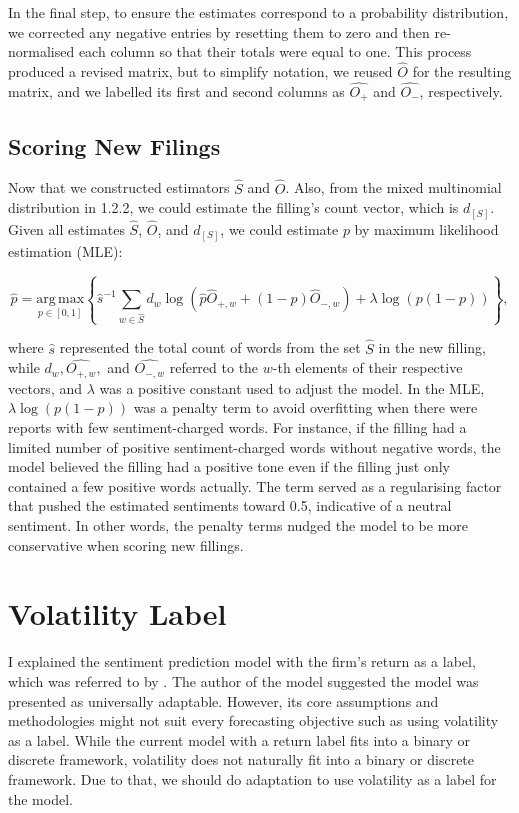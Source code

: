 \documentclass[logo,bsc,singlespacing,parskip]{infthesis}
\begin{document}
In the final step, to ensure the estimates correspond to a probability distribution, we corrected any negative entries by resetting them to zero and then re-normalised each column so that their totals were equal to one. This process produced a revised matrix, but to simplify notation, we reused $\hat{O}$ for the resulting matrix, and we labelled its first and second columns as $\hat{O_+}$ and $ \hat{O_-}$, respectively. 

\subsection{Scoring New Filings}

Now that we constructed estimators $\hat{S}$  and $\hat{O}$. Also, from the mixed multinomial distribution in 1.2.2, we could estimate the filling’s count vector, which is $d_{[S]}$. Given all estimates $\hat{S}$, $\hat{O}$, and $d_{[S]}$, we could estimate $p$ by maximum likelihood estimation (MLE):

\begin{equation} \label{4.8}
\hat{p} = \underset{p \in [0,1]}{\mathrm{arg\,max}} \left\{ \hat{s}^{-1} \sum_{w \in \hat{S}} d_w \log (\hat{p}\hat{O}_{+,w} + (1 - p)\hat{O}_{-,w}) + \lambda \log(p(1 - p)) \right\},
\end{equation}

where $\hat{s}$ represented the total count of words from the set $\hat{S}$ in the new filling, while $d_w, \hat{O_{+,w}},$ and $ \hat{O_{-,w}}$ referred to the $w$-th elements of their respective vectors, and $\lambda$ was a positive constant used to adjust the model. In the MLE, $\lambda \log(p(1 - p))$ was a penalty term to avoid overfitting when there were reports with few sentiment-charged words. For instance, if the filling had a limited number of positive sentiment-charged words without negative words, the model believed the filling had a positive tone even if the filling just only contained a few positive words actually. The term served as a regularising factor that pushed the estimated sentiments toward 0.5, indicative of a neutral sentiment. In other words, the penalty terms nudged the model to be more conservative when scoring new fillings. 

\section{Volatility Label}
\label{sec:volatility_label}
I explained the sentiment prediction model with the firm’s return as a label, which was referred to by \cite{ke2020predicting}. The author of the model suggested the model was presented as universally adaptable. However, its core assumptions and methodologies might not suit every forecasting objective such as using volatility as a label. While the current model with a return label fits into a binary or discrete framework, volatility does not naturally fit into a binary or discrete framework. Due to that, we should do adaptation to use volatility as a label for the model. 
\end{document}
